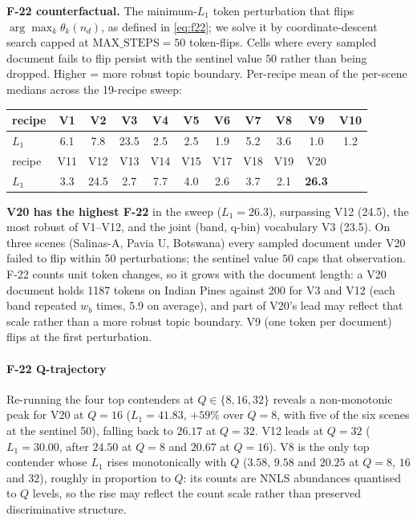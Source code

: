 \documentclass[journal,a4paper,10pt]{IEEEtran}
\begin{document}
\textbf{F-22 counterfactual.} The minimum-$L_1$ token perturbation
that flips $\arg\max_k \theta_k(n_d)$, as defined in \eqref{eq:f22};
we solve it by coordinate-descent search capped at
$\text{MAX\_STEPS} = 50$ token-flips. Cells where every sampled
document fails to flip persist with the sentinel value $50$ rather
than being dropped. Higher = more robust topic boundary. Per-recipe
mean of the per-scene medians across the 19-recipe sweep:

\begin{center}
\scriptsize
\setlength{\tabcolsep}{3pt}
\begin{tabular}{l*{10}{c}}
\toprule
recipe & V1 & V2 & V3 & V4 & V5 & V6 & V7 & V8 & V9 & V10 \\
\midrule
$L_1$ & 6.1 & 7.8 & 23.5 & 2.5 & 2.5 & 1.9 & 5.2 & 3.6 & 1.0 & 1.2 \\
\midrule
recipe & V11 & V12 & V13 & V14 & V15 & V17 & V18 & V19 & V20 & \\
\midrule
$L_1$ & 3.3 & 24.5 & 2.7 & 7.7 & 4.0 & 2.6 & 3.7 & 2.1 & \textbf{26.3} & \\
\bottomrule
\end{tabular}
\end{center}

\textbf{V20 has the highest F-22} in the sweep
($L_1 = 26.3$), surpassing V12 (24.5), the most robust of V1--V12,
and the joint (band, q-bin) vocabulary V3 (23.5). On three scenes (Salinas-A,
Pavia U, Botswana) every sampled document under V20 failed to flip
within 50 perturbations; the sentinel value $50$ caps that
observation. F-22 counts unit token changes, so it grows with the
document length: a V20 document holds 1187 tokens on Indian Pines
against 200 for V3 and V12 (each band repeated $w_b$ times, 5.9 on
average), and part of V20's lead may reflect that scale rather than a
more robust topic boundary. V9 (one token per document) flips at the
first perturbation.

\paragraph{F-22 Q-trajectory} Re-running the four top contenders at
$Q \in \{8, 16, 32\}$ reveals a non-monotonic peak for V20 at $Q=16$
($L_1 = 41.83$, $+59\%$ over $Q=8$, with five of the six scenes at the
sentinel 50), falling back to $26.17$ at $Q=32$. V12 leads at $Q=32$
($L_1 = 30.00$, after $24.50$ at $Q=8$ and $20.67$ at $Q=16$). V8 is the
only top contender whose $L_1$ rises monotonically with $Q$ ($3.58$,
$9.58$ and $20.25$ at $Q = 8$, $16$ and $32$), roughly in proportion to
$Q$: its counts are NNLS abundances quantised to $Q$ levels, so the
rise may reflect the count scale rather than preserved discriminative
structure.
\end{document}
